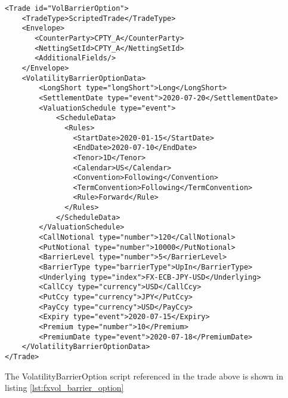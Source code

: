 \begin{verbatim}
<Trade id="VolBarrierOption">
    <TradeType>ScriptedTrade</TradeType>
  	<Envelope>
  	   <CounterParty>CPTY_A</CounterParty>
  	   <NettingSetId>CPTY_A</NettingSetId>
  	   <AdditionalFields/>
  	</Envelope>
  	<VolatilityBarrierOptionData>
        <LongShort type="longShort">Long</LongShort>
        <SettlementDate type="event">2020-07-20</SettlementDate>
        <ValuationSchedule type="event">
            <ScheduleData>
              <Rules>
                <StartDate>2020-01-15</StartDate>
                <EndDate>2020-07-10</EndDate>
                <Tenor>1D</Tenor>
                <Calendar>US</Calendar>
                <Convention>Following</Convention>
                <TermConvention>Following</TermConvention>
                <Rule>Forward</Rule>
              </Rules>
            </ScheduleData>
        </ValuationSchedule>
        <CallNotional type="number">120</CallNotional>
        <PutNotional type="number">10000</PutNotional>
        <BarrierLevel type="number">5</BarrierLevel>
        <BarrierType type="barrierType">UpIn</BarrierType>
        <Underlying type="index">FX-ECB-JPY-USD</Underlying>
        <CallCcy type="currency">USD</CallCcy>
        <PutCcy type="currency">JPY</PutCcy>
        <PayCcy type="currency">USD</PayCcy>
        <Expiry type="event">2020-07-15</Expiry>
        <Premium type="number">10</Premium>        
        <PremiumDate type="event">2020-07-18</PremiumDate>
    </VolatilityBarrierOptionData>
</Trade>
\end{verbatim}

The VolatilityBarrierOption script referenced in the trade above is shown in listing
\ref{lst:fxvol_barrier_option}

